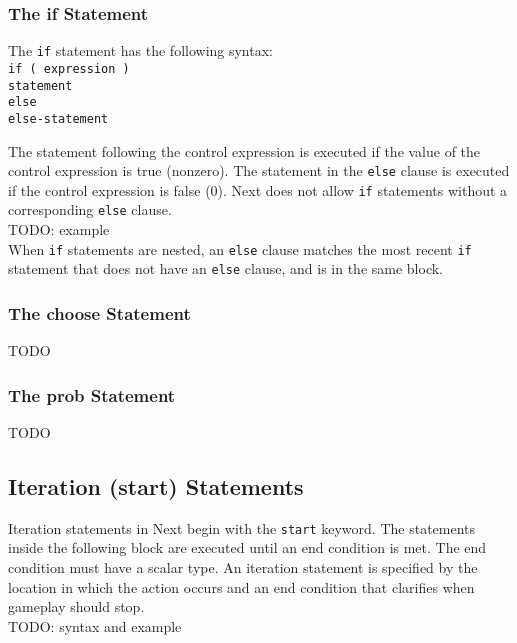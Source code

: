\documentclass[12pt]{article}
\begin{document}
\subsubsection{The if Statement}

The \texttt{if} statement has the following syntax: \\

\texttt{if ( expression ) \\
\indent \indent statement \\
\indent else \\
\indent \indent else-statement \\
}

\noindent The statement following the control expression is executed if the value of the control expression is true (nonzero).  The statement in the \texttt{else} clause is executed if the control expression is false (0).  Next does not allow \texttt{if} statements without a corresponding \texttt{else} clause.  \\

TODO: example \\

\noindent When \texttt{if} statements are nested, an \texttt{else} clause matches the most recent \texttt{if} statement that does not have an \texttt{else} clause, and is in the same block.

\subsubsection{The choose Statement}
TODO

\subsubsection{The prob Statement}
TODO

\subsection{Iteration (start) Statements}

Iteration statements in Next begin with the \texttt{start} keyword.  The statements inside the following block are executed until an end condition is met.  The end condition must have a scalar type.  An iteration statement is specified by the location in which the action occurs and an end condition that clarifies when gameplay should stop. \\

TODO: syntax and example
\end{document}

